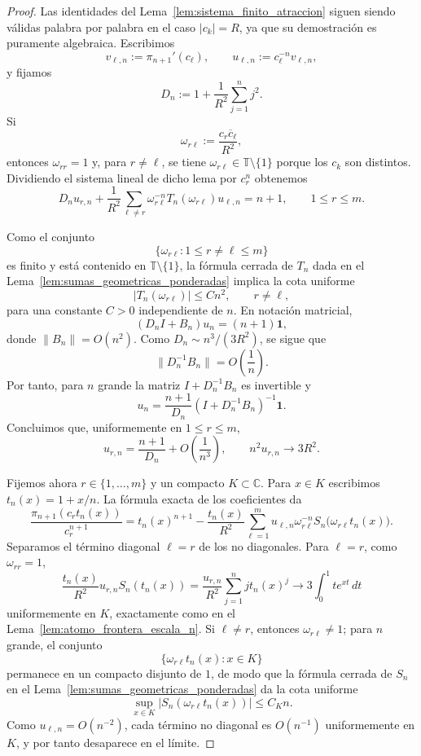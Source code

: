 \begin{proof}
	Las identidades del Lema~\ref{lem:sistema_finito_atraccion} siguen siendo válidas palabra por palabra en el caso $|c_k|=R$, ya que su demostración es puramente algebraica. Escribimos
	\[
		v_{\ell,n}:=\pi_{n+1}'(c_\ell),
		\qquad
		u_{\ell,n}:=c_\ell^{-n}v_{\ell,n},
	\]
	y fijamos
	\[
		D_n:=1+\frac1{R^2}\sum_{j=1}^n j^2.
	\]
	Si
	\[
		\omega_{r\ell}:=\frac{c_r\overline c_\ell}{R^2},
	\]
	entonces $\omega_{rr}=1$ y, para $r\neq \ell$, se tiene $\omega_{r\ell}\in\mathbb T\setminus\{1\}$ porque los $c_k$ son distintos. Dividiendo el sistema lineal de dicho lema por $c_r^n$ obtenemos
	\[
		D_n u_{r,n}
		+
		\frac1{R^2}\sum_{\ell\neq r}\omega_{r\ell}^{-n}T_n(\omega_{r\ell})u_{\ell,n}
		=
		n+1,
		\qquad 1\le r\le m.
	\]

	Como el conjunto
	\[
		\{\omega_{r\ell}: 1\le r\neq \ell\le m\}
	\]
	es finito y está contenido en $\mathbb T\setminus\{1\}$, la fórmula cerrada de $T_n$ dada en el Lema~\ref{lem:sumas_geometricas_ponderadas} implica la cota uniforme
	\[
		|T_n(\omega_{r\ell})|\le C n^2,
		\qquad r\neq \ell,
	\]
	para una constante $C>0$ independiente de $n$. En notación matricial,
	\[
		(D_n I+B_n)u_n=(n+1)\mathbf 1,
	\]
	donde $\|B_n\|=O(n^2)$. Como $D_n\sim n^3/(3R^2)$, se sigue que
	\[
		\|D_n^{-1}B_n\|=O\!\left(\frac1n\right).
	\]
	Por tanto, para $n$ grande la matriz $I+D_n^{-1}B_n$ es invertible y
	\[
		u_n=\frac{n+1}{D_n}(I+D_n^{-1}B_n)^{-1}\mathbf 1.
	\]
	Concluimos que, uniformemente en $1\le r\le m$,
	\[
		u_{r,n}=\frac{n+1}{D_n}+O\!\left(\frac1{n^3}\right),
		\qquad
		n^2u_{r,n}\longrightarrow 3R^2.
	\]

	Fijemos ahora $r\in\{1,\dots,m\}$ y un compacto $K\subset\mathbb C$. Para $x\in K$ escribimos $t_n(x)=1+x/n$. La fórmula exacta de los coeficientes da
	\[
		\frac{\pi_{n+1}(c_r t_n(x))}{c_r^{n+1}}
		=
		t_n(x)^{n+1}
		-
		\frac{t_n(x)}{R^2}
		\sum_{\ell=1}^m u_{\ell,n}\omega_{r\ell}^{-n}S_n\!\bigl(\omega_{r\ell}t_n(x)\bigr).
	\]
	Separamos el término diagonal $\ell=r$ de los no diagonales. Para $\ell=r$, como $\omega_{rr}=1$,
	\[
		\frac{t_n(x)}{R^2}u_{r,n}S_n(t_n(x))
		=
		\frac{u_{r,n}}{R^2}\sum_{j=1}^n j t_n(x)^j
		\longrightarrow
		3\int_0^1 t e^{xt}\,dt
	\]
	uniformemente en $K$, exactamente como en el Lema~\ref{lem:atomo_frontera_escala_n}. Si $\ell\neq r$, entonces $\omega_{r\ell}\neq 1$; para $n$ grande, el conjunto
	\[
		\{\omega_{r\ell}t_n(x): x\in K\}
	\]
	permanece en un compacto disjunto de $1$, de modo que la fórmula cerrada de $S_n$ en el Lema~\ref{lem:sumas_geometricas_ponderadas} da la cota uniforme
	\[
		\sup_{x\in K}|S_n(\omega_{r\ell}t_n(x))|\le C_K n.
	\]
	Como $u_{\ell,n}=O(n^{-2})$, cada término no diagonal es $O(n^{-1})$ uniformemente en $K$, y por tanto desaparece en el límite.


\end{proof}
